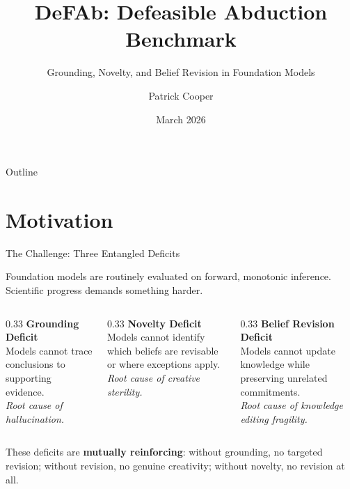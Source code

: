 \documentclass[aspectratio=169]{beamer}
\title{DeFAb: Defeasible Abduction Benchmark}
\subtitle{Grounding, Novelty, and Belief Revision in Foundation Models}
\author{Patrick Cooper}
\institute{University of Colorado Boulder}
\date{March 2026}
\begin{document}
\maketitle

\begin{frame}{Outline}
\tableofcontents
\end{frame}


\section{Motivation}

\begin{frame}{The Challenge: Three Entangled Deficits}

Foundation models are routinely evaluated on forward, monotonic inference.
Scientific progress demands something harder.

\vspace{0.8em}
\begin{columns}[T]
\begin{column}{0.33\textwidth}
\centering
\textbf{\textcolor{defabblue}{Grounding Deficit}}\\[4pt]
\small
Models cannot trace conclusions to supporting evidence.\\[4pt]
\textit{Root cause of hallucination.}
\end{column}

\begin{column}{0.33\textwidth}
\centering
\textbf{\textcolor{defabblue}{Novelty Deficit}}\\[4pt]
\small
Models cannot identify which beliefs are revisable or where exceptions apply.\\[4pt]
\textit{Root cause of creative sterility.}
\end{column}

\begin{column}{0.33\textwidth}
\centering
\textbf{\textcolor{defabblue}{Belief Revision Deficit}}\\[4pt]
\small
Models cannot update knowledge while preserving unrelated commitments.\\[4pt]
\textit{Root cause of knowledge editing fragility.}
\end{column}
\end{columns}

\vspace{1em}
These deficits are \textbf{mutually reinforcing}: without grounding, no targeted revision; without revision, no genuine creativity; without novelty, no revision at all.
\end{frame}
\end{document}
